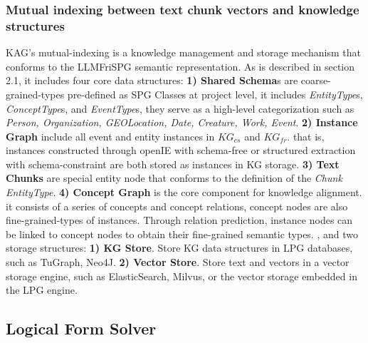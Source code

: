 \documentclass{article}
\begin{document}
\subsubsection{Mutual indexing between text chunk vectors and knowledge structures}

KAG's mutual-indexing is a knowledge management and storage mechanism that conforms to the LLMFriSPG semantic representation. As is described in section 2.1, it includes four core data structures:  \textbf{1) Shared Schema}s are coarse-grained-types pre-defined as SPG Classes at project level, it includes \textit{EntityType}s, \textit{ConceptType}s, and \textit{EventType}s, they serve as a high-level categorization such as \textit{Person, Organization, GEOLocation, Date, Creature, Work, Event}. \textbf{2) Instance Graph} include all event and entity instances in $KG_{cs}$ and $KG_{fr}$. that is, instances constructed through openIE with schema-free or structured extraction with schema-constraint are both stored as instances in KG storage. \textbf{3) Text Chunks} are special entity node that conforms to the definition of the \textit{Chunk EntityType}. \textbf{4) Concept Graph} is the core component for knowledge alignment. it consists of a series of concepts and concept relations, concept nodes are also fine-grained-types of instances. Through relation prediction, instance nodes can be linked to concept nodes to obtain their fine-grained semantic types.
, and two storage structures: \textbf{1) KG Store}. Store KG data structures in LPG databases, such as TuGraph, Neo4J. \textbf{2) Vector Store}. Store text and vectors in a vector storage engine, such as ElasticSearch, Milvus, or the vector storage embedded in the LPG engine.



\subsection{Logical Form Solver}
\end{document}
